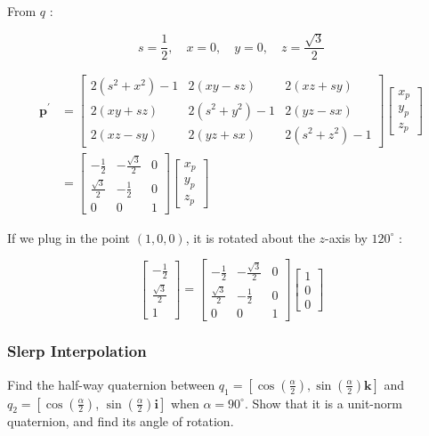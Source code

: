 \documentclass[10pt]{article}
\begin{document}
From $q$ :

$$
s=\frac{1}{2}, \quad x=0, \quad y=0, \quad z=\frac{\sqrt{3}}{2}
$$

$$
\begin{aligned}
\mathbf{p}^{\prime} & =\left[\begin{array}{ccc}
2\left(s^{2}+x^{2}\right)-1 & 2(x y-s z) & 2(x z+s y) \\
2(x y+s z) & 2\left(s^{2}+y^{2}\right)-1 & 2(y z-s x) \\
2(x z-s y) & 2(y z+s x) & 2\left(s^{2}+z^{2}\right)-1
\end{array}\right]\left[\begin{array}{l}
x_{p} \\
y_{p} \\
z_{p}
\end{array}\right] \\
& =\left[\begin{array}{ccc}
-\frac{1}{2} & -\frac{\sqrt{3}}{2} & 0 \\
\frac{\sqrt{3}}{2} & -\frac{1}{2} & 0 \\
0 & 0 & 1
\end{array}\right]\left[\begin{array}{l}
x_{p} \\
y_{p} \\
z_{p}
\end{array}\right]
\end{aligned}
$$

If we plug in the point $(1,0,0)$, it is rotated about the $z$-axis by $120^{\circ}$ :

$$
\left[\begin{array}{c}
-\frac{1}{2} \\
\frac{\sqrt{3}}{2} \\
1
\end{array}\right]=\left[\begin{array}{ccc}
-\frac{1}{2} & -\frac{\sqrt{3}}{2} & 0 \\
\frac{\sqrt{3}}{2} & -\frac{1}{2} & 0 \\
0 & 0 & 1
\end{array}\right]\left[\begin{array}{l}
1 \\
0 \\
0
\end{array}\right]
$$

\subsubsection{Slerp Interpolation}
Find the half-way quaternion between $q_{1}=\left[\cos \left(\frac{\alpha}{2}\right), \sin \left(\frac{\alpha}{2}\right) \mathbf{k}\right]$ and $q_{2}=\left[\cos \left(\frac{\alpha}{2}\right)\right.$, $\left.\sin \left(\frac{\alpha}{2}\right) \mathbf{i}\right]$ when $\alpha=90^{\circ}$. Show that it is a unit-norm quaternion, and find its angle of rotation.
\end{document}
